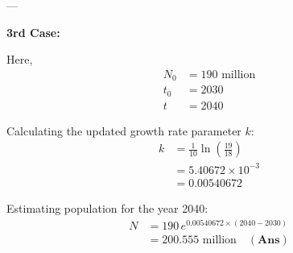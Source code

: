 ---

\textbf{3rd Case:}

Here,
\begin{align*}
    N_0 &= 190 \text{ million} \\
    t_0 &= 2030 \\
    t &= 2040
\end{align*}

Calculating the updated growth rate parameter $k$:
\begin{align*}
    k &= \frac{1}{10} \ln\left(\frac{19}{18}\right) \\
    &= 5.40672 \times 10^{-3} \\
    &= 0.00540672
\end{align*}

Estimating population for the year 2040:
\begin{align*}
    N &= 190 \, e^{0.00540672 \times (2040 - 2030)} \\
    &= 200.555 \text{ million} \quad \mathbf{(\text{Ans})}
\end{align*}